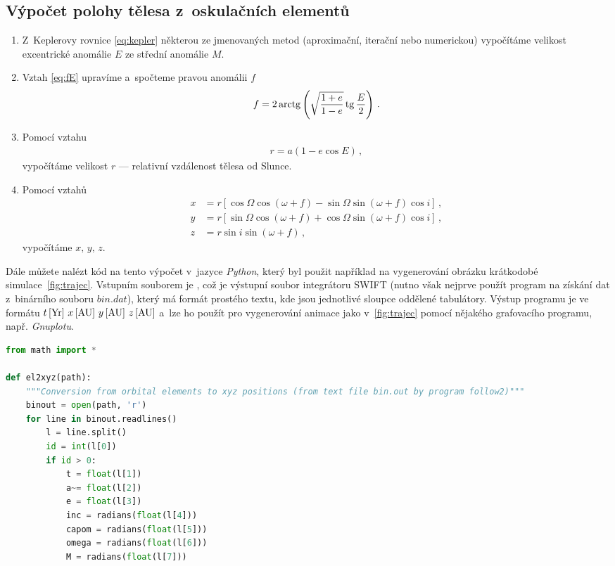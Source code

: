 \documentclass[A4paper, 12pt, oneside]{book}
\begin{document}
\begin{appendices}
	\chapter{Výpočet polohy tělesa z~oskulačních elementů} \label{app:el2xyz}
\begin{enumerate}[label=\arabic*.]
	\item Z~Keplerovy rovnice \eqref{eq:kepler} některou ze jmenovaných metod (aproximační, iterační nebo numerickou) vypočítáme velikost excentrické anomálie $E$ ze střední anomálie $M$.
	\item Vztah \eqref{eq:fE} upravíme a~spočteme pravou anomálii $f$
		\begin{align}
			f = 2\operatorname{arctg}\left(\sqrt{\frac{1+e}{1-e}}\operatorname{tg} \frac{E}{2}\right)\,.
		\end{align}
	\item Pomocí vztahu 
\vspace{-12pt}
		\begin{align}
			r=a(1-e\cos E)\,,
		\end{align}
		vypočítáme velikost $r$ --- relativní vzdálenost tělesa od Slunce.
	\item Pomocí vztahů
\vspace{-12pt}
		\begin{align}
			x&=r\left[\cos\Omega\cos(\omega+f)-\sin\Omega\sin(\omega+f)\cos i\right]\,, \\
			y&=r\left[\sin\Omega\cos(\omega+f)+\cos\Omega\sin(\omega+f)\cos i\right]\,, \\
			z&=r\sin i\sin(\omega+f)\,,
		\end{align}
		vypočítáme $x,\,y,\,z$.
\end{enumerate}

	Dále můžete nalézt kód na tento výpočet v~jazyce \textit{Python}, který byl použit například na vygenerování obrázku krátkodobé simulace~\ref{fig:trajec}. Vstupním souborem je , což je výstupní soubor integrátoru SWIFT (nutno však nejprve použít program  na získání dat z~binárního souboru $bin.dat$), který má formát prostého textu, kde jsou jednotlivé sloupce oddělené tabulátory. Výstup programu je ve formátu $t\,[{\rm Yr}]\ x\,[{\rm AU}]\ y\,[{\rm AU}]\ z\,[{\rm AU}]$ a~lze ho použít pro vygenerování animace jako v~\ref{fig:trajec} pomocí nějakého grafovacího programu, např. \textit{Gnuplotu}.
	\begin{lstlisting}[language=Python]
from math import *

def el2xyz(path):
    """Conversion from orbital elements to xyz positions (from text file bin.out by program follow2)"""
    binout = open(path, 'r')
    for line in binout.readlines()
        l = line.split()
        id = int(l[0])
        if id > 0:
            t = float(l[1])
            a~= float(l[2])
            e = float(l[3])
            inc = radians(float(l[4]))
            capom = radians(float(l[5]))
            omega = radians(float(l[6]))
            M = radians(float(l[7]))
    

\end{lstlisting}
\end{appendices}
\end{document}
